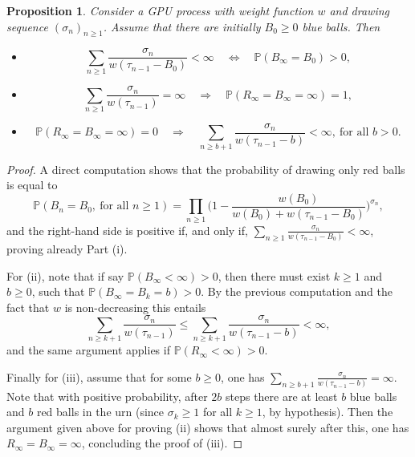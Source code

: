 \documentclass[10pt,a4paper]{amsart}
\newtheorem {prop} {Proposition} [section]
\newcommand{\1}{{\text{\Large $\mathfrak 1$}}}
\begin{document}
\begin{prop} \label{prop:GPU}
Consider a GPU process with weight function $w$ and drawing sequence $(\sigma_n)_{n\ge 1}$. Assume that there are initially $B_0\ge 0$ blue balls. Then 
\begin{itemize}
\item[(i)]
$$\sum_{n\ge 1} \frac {\sigma_n}{w(\tau_{n-1}-B_0)} <\infty   \quad  \Longleftrightarrow \quad \mathbb P(B_\infty= B_0 ) >0,$$ 
\item[(ii)] 
$$ \sum_{n\ge 1} \frac {\sigma_n}{w(\tau_{n-1})} =\infty   \quad  \Longrightarrow \quad \mathbb P(R_\infty = B_\infty = \infty) =1,$$ 
\item[(iii)] 
$$\mathbb P(R_\infty = B_\infty = \infty) =0 \quad  \Longrightarrow \quad \sum_{n\ge b+1} \frac {\sigma_n}{w(\tau_{n-1}-b)} <\infty, \ \text{for all }b>0.$$ 
\end{itemize}
\end{prop}
\begin{proof}
A direct computation shows that the probability of drawing only red balls is equal to 
$$\mathbb P(B_n = B_0, \ \text{for all }n\ge 1) = \prod_{n\ge 1} \big(1- \frac{w(B_0)}{w(B_0) + w(\tau_{n-1}-B_0)}\big)^{\sigma_n},$$
and the right-hand side is positive if, and only if, $\sum_{n\ge 1} \frac{\sigma_n}{w(\tau_{n-1}-B_0)}<\infty$, proving already Part (i). 


For (ii), note that if say $\mathbb P(B_\infty<\infty)>0$, then there must exist $k\ge 1$ and $b\ge 0$, such that 
$\mathbb P(B_\infty = B_k =b  ) >0$. By the previous computation and the fact that $w$ is non-decreasing this entails 
$$\sum_{n\ge k+1} \frac {\sigma_n}{w(\tau_{n-1})} \le \sum_{n\ge k+1} \frac {\sigma_n}{w(\tau_{n-1}-b)} <\infty,$$ 
and the same argument applies if $\mathbb P(R_\infty<\infty)>0$. 


Finally for (iii), assume that for some $b\ge 0$, one has $\sum_{n\ge b+1} \frac {\sigma_n}{w(\tau_{n-1}-b)} =\infty$. Note that with positive probability, after $2b$ steps there are at least $b$ blue balls and $b$ red balls in the urn (since $\sigma_k\ge 1$ for all $k\ge 1$, by hypothesis). Then the argument given above for proving (ii) shows that almost surely after this, one has $R_\infty = B_\infty = \infty$, concluding the proof of (iii). 
\end{proof}
\end{document}
